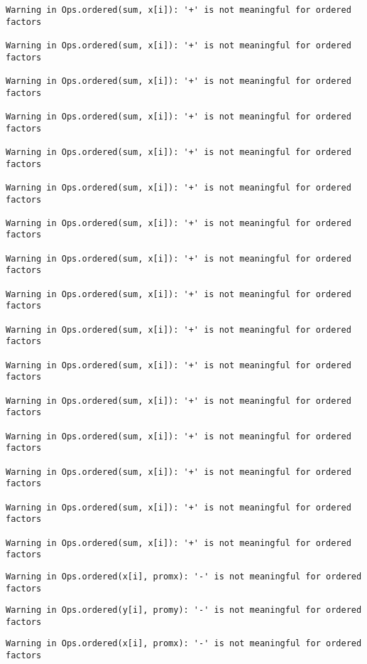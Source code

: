 \documentclass[]{article}
\begin{document}
\begin{verbatim}
Warning in Ops.ordered(sum, x[i]): '+' is not meaningful for ordered
factors

Warning in Ops.ordered(sum, x[i]): '+' is not meaningful for ordered
factors

Warning in Ops.ordered(sum, x[i]): '+' is not meaningful for ordered
factors

Warning in Ops.ordered(sum, x[i]): '+' is not meaningful for ordered
factors

Warning in Ops.ordered(sum, x[i]): '+' is not meaningful for ordered
factors

Warning in Ops.ordered(sum, x[i]): '+' is not meaningful for ordered
factors

Warning in Ops.ordered(sum, x[i]): '+' is not meaningful for ordered
factors

Warning in Ops.ordered(sum, x[i]): '+' is not meaningful for ordered
factors

Warning in Ops.ordered(sum, x[i]): '+' is not meaningful for ordered
factors

Warning in Ops.ordered(sum, x[i]): '+' is not meaningful for ordered
factors

Warning in Ops.ordered(sum, x[i]): '+' is not meaningful for ordered
factors

Warning in Ops.ordered(sum, x[i]): '+' is not meaningful for ordered
factors

Warning in Ops.ordered(sum, x[i]): '+' is not meaningful for ordered
factors

Warning in Ops.ordered(sum, x[i]): '+' is not meaningful for ordered
factors

Warning in Ops.ordered(sum, x[i]): '+' is not meaningful for ordered
factors

Warning in Ops.ordered(sum, x[i]): '+' is not meaningful for ordered
factors
\end{verbatim}

\begin{verbatim}
Warning in Ops.ordered(x[i], promx): '-' is not meaningful for ordered
factors
\end{verbatim}

\begin{verbatim}
Warning in Ops.ordered(y[i], promy): '-' is not meaningful for ordered
factors
\end{verbatim}

\begin{verbatim}
Warning in Ops.ordered(x[i], promx): '-' is not meaningful for ordered
factors
\end{verbatim}
\end{document}
